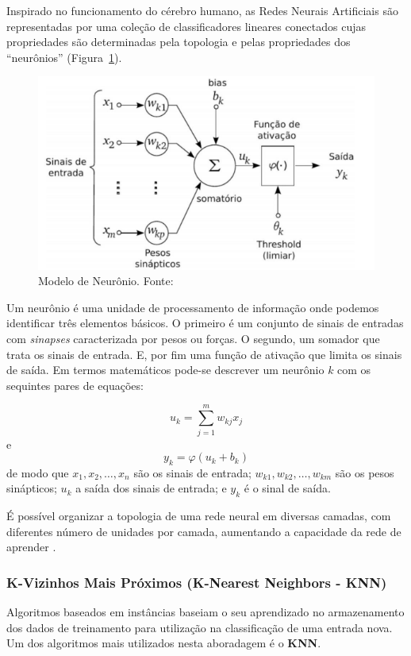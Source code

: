 \documentclass[12pt]{article}
\begin{document}
Inspirado no funcionamento do cérebro humano, as Redes Neurais Artificiais são representadas por uma coleção de classificadores lineares conectados cujas propriedades são determinadas pela topologia e pelas propriedades dos ``neurônios'' (Figura~\ref{fig_neuronio}).

\begin{figure}[h]
  \centering
  \includegraphics[width=.4\textwidth]{img/fig_neuronio.png}
  \caption{Modelo de Neurônio. Fonte: \cite{haykin:2001}}
  \label{fig_neuronio}
\end{figure}

Um neurônio é uma unidade de processamento de informação onde podemos identificar três elementos básicos. O primeiro é um conjunto de sinais de entradas com \textit{sinapses} caracterizada por pesos ou forças. O segundo, um somador que trata os sinais de entrada. E, por fim uma função de ativação que limita os sinais de saída. Em termos matemáticos pode-se descrever um neurônio $k$ com os sequintes pares de equações:

\begin{equation}
  u_k = \sum_{j = 1}^{m} w_{kj}x_j
\end{equation}
e
\begin{equation}
  y_k = \varphi (u_k + b_k)
\end{equation}
de modo que $x_1, x_2, \ldots, x_n$ são os sinais de entrada; $w_{k1}, w_{k2}, \ldots, w_{km}$ são os pesos sinápticos; $u_k$ a saída dos sinais de entrada; e $y_k$ é o sinal de saída.

É possível organizar a topologia de uma rede neural em diversas camadas, com diferentes número de unidades por camada, aumentando a capacidade da rede de aprender \cite{haykin:2001}.

\subsubsection{K-Vizinhos Mais Próximos (\textbf{K-Nearest Neighbors - KNN})}

Algoritmos baseados em instâncias baseiam o seu aprendizado no armazenamento dos dados de treinamento para utilização na classificação de uma entrada nova. Um dos algoritmos mais utilizados nesta aboradagem é o \textbf{KNN}.
\end{document}
